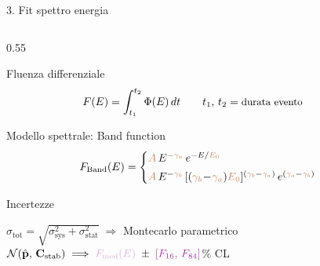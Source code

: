 \documentclass[aspectratio=169]{beamer}
\begin{document}

\begin{frame}{3. Fit spettro energia}
\begin{columns}
    \begin{column}{0.55\textwidth}
        \begin{block}{Fluenza differenziale}
            \vspace{-0.5em}
            \begin{equation*}
               \hspace{-2em} F(E) = \int_{t_1}^{t_2} \Phi(E)\,dt
               \qquad \small t_1,\,t_2 = \text{durata evento}
            \end{equation*}
            \vspace{-1.0em}
        \end{block}
        \vspace{0.2em}
        \begin{block}{Modello spettrale: Band function}
            \small
            \vspace{-1.5em}
            \begin{equation*}
                F_{\text{Band}}(E) = 
                \begin{cases}
                    \textcolor{teipel_red!70}{A}\,E^{-\textcolor{teipel_red!70}{\gamma_a}}\,
                    e^{-E/\textcolor{teipel_red!70}{E_0}} 
                    \\[0.3em]
                    \textcolor{teipel_red!70}{A}\,E^{-\textcolor{teipel_red!70}{\gamma_b}}\,
                    [(\textcolor{teipel_red!70}{\gamma_b}\!-\!\textcolor{teipel_red!70}{\gamma_a})\textcolor{teipel_red!70}{E_0}]^{(\textcolor{teipel_red!70}{\gamma_b}-\textcolor{teipel_red!70}{\gamma_a})}\,
                    e^{(\textcolor{teipel_red!70}{\gamma_a}-\textcolor{teipel_red!70}{\gamma_b})}
                \end{cases}
            \end{equation*}
        \vspace{-1.0em}
        \end{block}
        \vspace{0.2em}
        \begin{block}{Incertezze}
            \small
            \begin{flushleft}
            \vspace{0.2em}
            $\sigma_{\text{tot}} = \sqrt{\sigma_{\text{sys}}^2 + \sigma_{\text{stat}}^2}
            \;\Longrightarrow$ Montecarlo parametrico\\[0.3em]
            \hspace*{0pt}$\mathcal{N}(\hat{\mathbf{p}},\, \mathbf{C}_{\text{stab}})
            \;\Longrightarrow\;
            \textcolor{violet!30}{F_{\text{med}}(E)} \;\pm\;\textcolor{violet!80}{[F_{16},\, F_{84}]}$\% CL
            \vspace{-0.3em}
            \end{flushleft}
        \end{block}
    \end{column}
    

\end{columns}
\end{frame}
\end{document}
